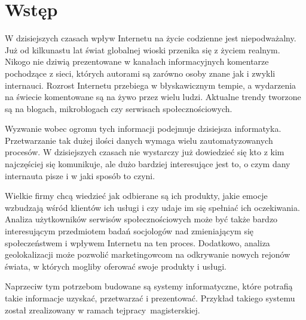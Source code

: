 \chapter{Wstęp}

\begin{comment}
- motywacja, po co to robimy
- state of the art. Jak wyglada dziedzina, ktora sie zajmujemy?
Stosujemy tu metode szybkiego top down z ogolnikow do szczegolow.
Przechodzimy do tematyki, ktora sie zajmujemy. Piszemy co zrobiono precyzyjnie
w danej tematyce. Cytujemy artykuly (ksiazki - won!) Piszemy to w celu ..
- .. zdefiniowania celow pracy
- a potem jak te cele chcemy osiagnac, jakimi metodami
- potem piszemy co bedzie znajdowac sie w kazdym z rodzialow
- i na koncu jaki jest impact pracy
\end{comment}

W dzisiejszych czasach wpływ Internetu na życie codzienne jest niepodważalny.
Już od kilkunastu lat świat globalnej wioski przenika się z życiem realnym.
Nikogo nie dziwią prezentowane w kanałach informacyjnych komentarze
pochodzące z sieci, których autorami są zarówno osoby znane jak i zwykli
internauci. Rozrost Internetu przebiega w błyskawicznym tempie, a wydarzenia na
świecie komentowane są na żywo przez wielu ludzi. Aktualne trendy tworzone są na
blogach, mikroblogach czy serwisach społecznościowych.

Wyzwanie wobec ogromu tych informacji podejmuje dzisiejsza informatyka.
Przetwarzanie tak dużej ilości danych wymaga wielu zautomatyzowanych procesów.
W dzisiejszych czasach nie wystarczy już dowiedzieć się kto z kim najczęściej
się komunikuje, ale dużo bardziej interesujące jest to, o czym dany internauta
pisze i w jaki sposób to czyni.

Wielkie firmy chcą wiedzieć jak odbierane są ich produkty, jakie emocje
wzbudzają wśród klientów ich usługi i czy udaje im się spełniać ich oczekiwania.
Analiza użytkowników serwisów społecznościowych może być także bardzo
interesującym przedmiotem badań socjologów nad zmieniającym się społeczeństwem i
wpływem Internetu na ten proces.
Dodatkowo, analiza geolokalizacji może pozwolić marketingowcom na
odkrywanie nowych rejonów świata, w których mogliby oferować swoje
produkty i usługi.

Naprzeciw tym potrzebom budowane są systemy informatyczne, które potrafią takie
informacje uzyskać, przetwarzać i prezentować. Przykład takiego systemu został
zrealizowany w ramach tej\linebreak pracy~magisterskiej.

